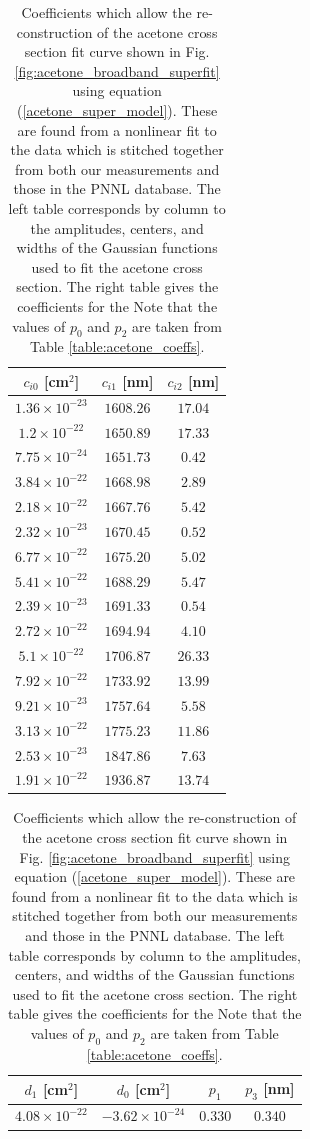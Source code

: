 \documentclass[12pt]{report}
\begin{document}
	\begin{table}[H]
		\caption{Coefficients which allow the re-construction of the acetone cross section fit curve shown in Fig. \ref{fig:acetone_broadband_superfit} using equation (\ref{acetone_super_model}). These are found from a nonlinear fit to the data which is stitched together from both our measurements and those in the PNNL database. The left table corresponds by column to the amplitudes, centers, and widths of the Gaussian functions used to fit the acetone cross section. The right table gives the coefficients for the  Note that the values of $p_0$ and $p_2$ are taken from Table \ref{table:acetone_coeffs}.}
		\begin{center}
			\begin{tabular}{|c|c|c|}
				\hline
				$c_{i0}$ [cm$^2$] & $c_{i1}$ [nm] & $c_{i2}$ [nm] \\
				\hline
				$1.36 \times 10^{-23}$ & $1608.26$ & $17.04$ \\
				\hline
				$1.2 \times 10^{-22}$ & $1650.89$ & $17.33$ \\
				\hline
				$7.75 \times 10^{-24}$ & $1651.73$ & $0.42$ \\
				\hline
				$3.84 \times 10^{-22}$ & $1668.98$ & $2.89$ \\
				\hline
				$2.18 \times 10^{-22}$ & $1667.76$ & $5.42$ \\
				\hline
				$2.32 \times 10^{-23}$ & $1670.45$ & $0.52$ \\
				\hline
				$6.77 \times 10^{-22}$ & $1675.20$ & $5.02$ \\
				\hline
				$5.41 \times 10^{-22}$ & $1688.29$ & $5.47$ \\
				\hline
				$2.39 \times 10^{-23}$ & $1691.33$ & $0.54$ \\
				\hline
				$2.72 \times 10^{-22}$ & $1694.94$ & $4.10$ \\
				\hline
				$5.1 \times 10^{-22}$ & $1706.87$ & $26.33$ \\
				\hline
				$7.92 \times 10^{-22}$ & $1733.92$ & $13.99$ \\
				\hline
				$9.21 \times 10^{-23}$ & $1757.64$ & $5.58$ \\
				\hline
				$3.13 \times 10^{-22}$ & $1775.23$ & $11.86$ \\
				\hline
				$2.53 \times 10^{-23}$ & $1847.86$ & $7.63$ \\
				\hline
				$1.91 \times 10^{-22}$ & $1936.87$ & $13.74$ \\
				\hline
			\end{tabular}
			\begin{tabular}{|c|c|c|c|}
				\hline
				$d_{1}$ [cm$^2$] & $d_{0}$ [cm$^2$] & $p_1$ & $p_3$ [nm] \\
				\hline
				$4.08 \times 10^{-22}$ & $-3.62 \times 10^{-24}$ & $0.330$ & $0.340$ \\
				\hline
			\end{tabular}
		\end{center}
		\label{tbl:acetone_broadband_coeffs}
	\end{table}
	
\end{document}
